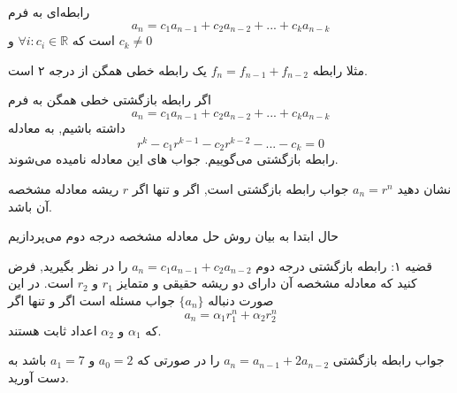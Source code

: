 \begin{definition}
    رابطه‌ای به فرم
   \[a_n=c_{1}a_{n-1}+c_{2}a_{n-2}+...+c_{k}a_{n-k}\]
   است که
   $\forall{i}:c_i \in \mathbb{R} $
   و 
   $ c_k\neq 0$


\end{definition}

مثلا رابطه‌ 
$f_n=f_{n-1}+f_{n-2}$
یک رابطه‌ خطی همگن از درجه ۲ است.

\begin{definition}
    اگر رابطه‌ بازگشتی خطی همگن به فرم
    \[a_n=c_{1}a_{n-1}+c_{2}a_{n-2}+...+c_{k}a_{n-k}\]
    داشته باشیم, به معادله
    \[r^k-c_{1}r^{k-1}-c_{2}r^{k-2}-...-c_{k}=0\]
    رابطه‌ بازگشتی می‌گوییم.
     جواب های این معادله 
    نامیده می‌شوند.

\end{definition}
\begin{problem}
    نشان دهید
    $a_n=r^n$
    جواب رابطه‌ بازگشتی است, اگر و تنها اگر 
    $r$
    ریشه معادله مشخصه آن باشد.
\end{problem}
حال
ابتدا به بیان روش حل معادله مشخصه درجه دوم می‌پردازیم
\begin{theorem}
    قضیه ۱:
    رابطه‌ بازگشتی درجه دوم
    $a_n=c_1 a_{n-1}+c_2 a_{n-2}$
    را در نظر بگیرید, فرض کنید که معادله مشخصه آن دارای دو ریشه حقیقی و متمایز 
    $r_1$ و $r_2$
    است.
    در این صورت دنباله 
    $\{a_n\}$
    جواب مسئله است اگر و تنها اگر
    \[a_n=\alpha_1 r_1^n+\alpha_2 r_2^n\]
    که
    $\alpha_1$
    و
    $\alpha_2$
    اعداد ثابت هستند.

\end{theorem}
\begin{problem}
    جواب رابطه‌ بازگشتی 
    $a_n=a_{n-1}+2a_{n-2}$
    را در صورتی که
    $a_0=2$
    و
    $a_1=7$
    باشد به دست آورید.
\end{problem}
